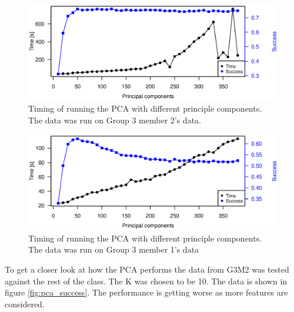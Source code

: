 \begin{figure}[H]
\centering
\includegraphics[width =0.8 \textwidth]{graphics/pca_timing}
\caption[Timing of PCA]{Timing of running the PCA with different principle components. 
The data was run on Group 3 member 2's data. 
}
\label{fig:pca_timing_lukas}
\end{figure}
\begin{figure}[H]
\centering
\includegraphics[width =0.8 \textwidth]{graphics/pca_timing_nikolaj}
\caption[Timing of PCA]{Timing of running the PCA with different principle components. 
The data was run on Group 3 member 1's data}
\label{fig:pca_timing_nikolaj}
\end{figure}

To get a closer look at how the PCA performs the data from G3M2 was tested against the rest of the class. 
The K was chosen to be 10. 
The data is shown in figure \ref{fig:pca_success}.
The performance is getting worse as more features are considered.
